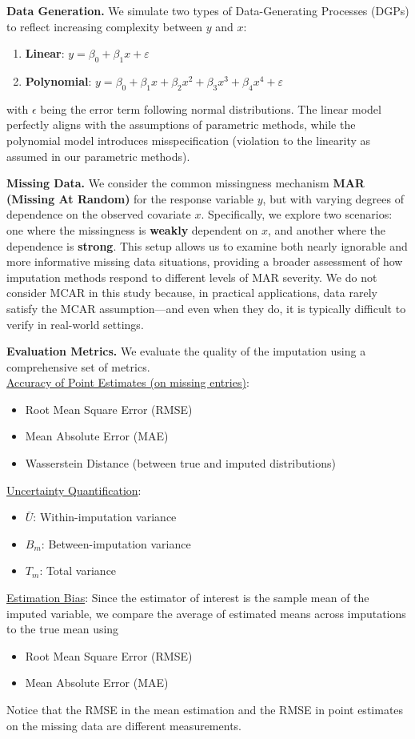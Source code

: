 \documentclass[12pt,oneside]{amsart}
\theoremstyle{definition}
\theoremstyle{remark}
\numberwithin{equation}{section}
\begin{document}
\textbf{Data Generation.}
We simulate two types of Data-Generating Processes (DGPs) to reflect increasing complexity between $y$ and $x$:
\begin{enumerate}
  \item \textbf{Linear}: $y = \beta_0 + \beta_1 x + \varepsilon$
  \item \textbf{Polynomial}: $y = \beta_0 + \beta_1 x + \beta_2 x^2 +  \beta_3 x^3 +  \beta_4 x^4 + \varepsilon$
\end{enumerate}
with $\epsilon$ being the error term following normal distributions. The linear model perfectly aligns with the assumptions of parametric methods, while the polynomial model introduces misspecification (violation to the linearity as assumed in our parametric methods).

\textbf{Missing Data.}
We consider the common missingness mechanism \textbf{MAR (Missing At Random)} for the response variable $y$, but with varying degrees of dependence on the observed covariate $x$. Specifically, we explore two scenarios: one where the missingness is \textbf{weakly} dependent on $x$, and another where the dependence is \textbf{strong}. This setup allows us to examine both nearly ignorable and more informative missing data situations, providing a broader assessment of how imputation methods respond to different levels of MAR severity. We do not consider MCAR in this study because, in practical applications, data rarely satisfy the MCAR assumption—and even when they do, it is typically difficult to verify in real-world settings.

\textbf{Evaluation Metrics.}
We evaluate the quality of the imputation using a comprehensive set of metrics.\\
\underline{Accuracy of Point Estimates (on missing entries)}:
\begin{itemize}
\item Root Mean Square Error (RMSE)
\item Mean Absolute Error (MAE)
\item Wasserstein Distance (between true and imputed distributions)
\end{itemize}
\underline{Uncertainty Quantification}:
\begin{itemize}
\item $\bar{U}$: Within-imputation variance
\item $B_m$: Between-imputation variance
\item $T_m$: Total variance
\end{itemize}
\underline{Estimation Bias}: Since the estimator of interest is the sample mean of the imputed variable, we compare the average of estimated means across imputations to the true mean using 
\begin{itemize}
\item Root Mean Square Error (RMSE)
\item Mean Absolute Error (MAE)
\end{itemize}
Notice that the RMSE in the mean estimation and the RMSE in point estimates on the missing data are different measurements. 
\end{document}
